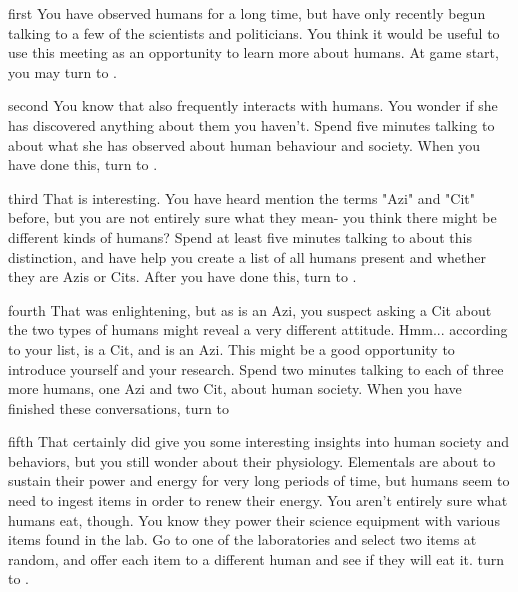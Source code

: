 \documentclass[notebook]{elementals} %
\begin{document}
\startnotebook{\nLearnAboutHumans{}}

\begin{page}{first}
You have observed humans for a long time, but have only recently begun talking to a few of the scientists and politicians.  You think it would be useful to use this meeting as an opportunity to learn more about humans.  At game start, you may  turn to .
\end{page}

\begin{page}{second}
You know that \cJuliet{} also frequently interacts with humans.  You wonder if she has discovered anything about them you haven't.  Spend five minutes talking to \cJuliet{\them} about what she has observed about human behaviour and society.  When you have done this, turn to .
\end {page}

\begin{page}{third}
 That is interesting.  You have heard \cDiplomat{} mention the terms "Azi" and "Cit" before, but you are not entirely sure what they mean- you think there might be different kinds of humans?  Spend at least five minutes talking to \cDiplomat{} about this distinction, and have \cDiplomat{\them} help you create a list of all humans present and whether they are Azis or Cits.  After you have done this, turn to .
\end{page}

\begin{page}{fourth}
That was enlightening, but as \cDiplomat{} is an Azi, you suspect asking a Cit about the two types of humans might reveal a very different attitude.  Hmm... according to your list, \cGD{\intro} is a Cit, and \cScientist{\intro} is an Azi.  This might be a good opportunity to introduce yourself and your research.  Spend two minutes talking to each of three more humans, one Azi and two Cit, about human society.  When you have finished these conversations, turn to 
\end{page}

\begin{page}{fifth}
 That certainly did give you some interesting insights into human society and behaviors, but you still wonder about their physiology.  Elementals are about to sustain their power and energy for very long periods of time, but humans seem to need to ingest items in order to renew their energy.  You aren't entirely sure what humans eat, though.  You know they power their science equipment with various items found in the lab.  Go to one of the laboratories and select two items at random, and offer each item to a different human and see if they will eat it.
 turn to .
\end{page}
\end{document}

